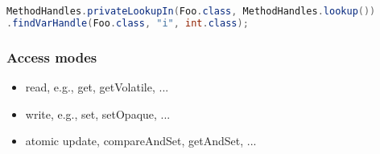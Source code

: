 \begin{lstlisting}[language=Java]
MethodHandles.privateLookupIn(Foo.class, MethodHandles.lookup())
.findVarHandle(Foo.class, "i", int.class);
\end{lstlisting}

\subsubsection{Access modes}
\begin{itemize}
	\item read, e.g., get, getVolatile, ...
	\item write, e.g., set, setOpaque, ...
	\item atomic update, compareAndSet, getAndSet, ...
\end{itemize}